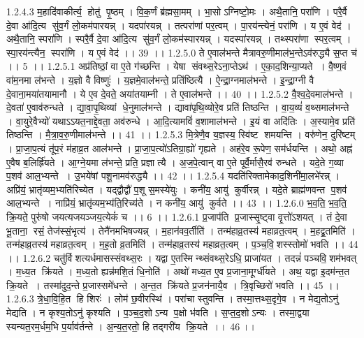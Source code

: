 1.2.4.3
म॒हादि॑वाकीर्त्य॒॒ होतु॑ पृ॒ष्ठम् । वि॒क॒र्णं ब्र॑ह्मसा॒मम् । भा॒सोऽग्निष्टो॒मः । अथै॒तानि॒ परा॑णि । परै॒र्वै दे॒वा आ॑दि॒त्य सु॑व॒र्गं लो॒कम॑पारयन्न् । यदपा॑रयन्न् । तत्परा॑णां पर॒त्वम् । पा॒रय॑न्त्येनं॒ परा॑णि । य ए॒वं वेद॑ । अथै॒तानि॒ स्परा॑णि । स्परै॒र्वै दे॒वा आ॑दि॒त्य सु॑व॒र्गं लो॒कम॑स्पारयन्न् । यदस्पा॑रयन्न् । तथ्स्परा॑णा स्पर॒त्वम् । स्पा॒रय॑न्त्यैन॒॒ स्परा॑णि । य ए॒वं वेद॑ ।। 39 ।।
1.2.5.0
ते ए॒वाल॑भन्ते मैत्रावरु॒णीमाल॑भ॒न्तेऽव॑रुद्ध्यै स॒प्त च॑ ।। 5 ।।
1.2.5.1
अप्र॑तिष्ठां॒ वा ए॒ते ग॑च्छन्ति । येषा॑ संवथ्स॒रेऽना॒प्तेऽथ॑ । ए॒का॒द॒शिन्या॒प्यते । वै॒ष्ण॒वं वा॑म॒नमा ल॑भन्ते । य॒ज्ञो वै विष्णुः॑ । य॒ज्ञमे॒वाल॑भन्ते॒ प्रति॑ष्ठित्यै । ऐ॒न्द्रा॒ग्नमाल॑भन्ते । इ॒न्द्रा॒ग्नी वै दे॒वाना॒मया॑तयामानौ । ये ए॒व दे॒वते॒ अया॑तयाम्नी । ते ए॒वाल॑भन्ते ।। 40 ।।
1.2.5.2
वै॒श्व॒दे॒वमाल॑भन्ते । दे॒वता॑ ए॒वाव॑रुन्धते । द्या॒वा॒पृ॒थिव्यां धे॒नुमाल॑भन्ते । द्यावा॑पृथि॒व्योरे॒व प्रति॑ तिष्ठन्ति । वा॒य॒व्यं॑ व॒थ्समाल॑भन्ते । वा॒युरे॒वैभ्यो॑ यथाऽऽयत॒नाद्दे॒वता॒ अव॑रुन्धे । आ॒दि॒त्यामविं॑ व॒शामाल॑भन्ते । इ॒यं वा अदि॑तिः । अ॒स्यामे॒व प्रति॑ तिष्ठन्ति । मै॒त्रा॒व॒रु॒णीमाल॑भन्ते ।। 41 ।।
1.2.5.3
मि॒त्रेणै॒व य॒ज्ञस्य॒ स्वि॑ष्ट शमयन्ति । वरु॑णेन॒ दुरि॑ष्टम् । प्रा॒जा॒प॒त्यं तू॑प॒रं म॑हाव्र॒त आल॑भन्ते । प्रा॒जा॒प॒त्यो॑ऽतिग्रा॒ह्यो॑ गृह्यते । अह॑रे॒व रू॒पेण॒ सम॑र्धयन्ति । अथो॒ अह्न॑ ए॒वैष ब॒लिर्ह्रि॑यते । आ॒ग्ने॒यमा ल॑भन्ते॒ प्रति॒ प्रज्ञात्यै । अ॒ज॒पे॒त्वान् वा ए॒ते पूर्वै॒र्मासै॒रव॑ रुन्धते । यदे॒ते ग॒व्या प॒शव॑ आल॒भ्यन्ते । उ॒भये॑षां पशू॒नामव॑रुद्ध्यै ।। 42 ।।
1.2.5.4
यदति॑रिक्तामेकाद॒शिनी॑मा॒लभे॑रन्न् । अप्रि॑यं॒ भ्रातृ॑व्यम॒भ्यति॑रिच्येत । यद्द्वौद्वौ॑ प॒शू स॒मस्ये॑युः । कनी॑य॒ आयु॑ कुर्वीरन्न् । यदे॒ते ब्राह्म॑णवन्त प॒शव॑ आल॒भ्यन्ते । नाप्रि॑यं॒ भ्रातृ॑व्यम॒भ्य॑ति॒रिच्य॑ते । न कनी॑य॒ आयु॑ कुर्वते ।। 43 ।।
1.2.6.0
भ॒व॒ति॒ भ॒व॒ति॒ क्रि॒यते॒ पुरु॑षो जयत्यजयञ्जय॒त्येकं॑ च ।। 6 ।।
1.2.6.1
प्र॒जाप॑ति प्र॒जास्सृ॒ष्ट्वा वृ॒त्तो॑ऽशयत् । तं दे॒वा भू॒ताना॒॒ रसं॒ तेज॑स्सं॒भृत्य॑ । तेनै॑नमभिषज्यन्न् । म॒हान॑वव॒र्तीति॑ । तन्म॑हाव्र॒तस्य॑ महाव्रत॒त्वम् । म॒हद्व्र॒तमिति॑ । तन्म॑हाव्र॒तस्य॑ महाव्रत॒त्वम् । म॒ह॒तो व्र॒तमिति॑ । तन्म॑हाव्र॒तस्य॑ महाव्रत॒त्वम् । प॒ञ्च॒वि॒॒शस्स्तोमो॑ भवति ।। 44 ।।
1.2.6.2
चतु॑र्विशत्यर्धमासस्संवथ्स॒रः । यद्वा ए॒तस्मिन्थ्संवथ्स॒रेऽधि॒ प्राजा॑यत । तदन्नं॑ पञ्चवि॒॒शम॑भवत् । म॒ध्य॒त क्रि॑यते । म॒ध्य॒तो ह्यन्न॑मशि॒तं धि॒नोति॑ । अथो॑ मध्य॒त ए॒व प्र॒जाना॒मूर्ग्धी॑यते । अथ॒ यद्वा इ॒दम॑न्त॒त क्रि॒यते । तस्मा॑दुद॒न्ते प्र॒जास्समे॑धन्ते । अ॒न्त॒त क्रि॑यते प्र॒जन॑नायै॒व । त्रि॒वृच्छिरो॑ भवति ।। 45 ।।
1.2.6.3
त्रे॒धा॒वि॒हि॒त हि शिरः॑ । लोम॑ छ॒वीरस्थि॑ । परा॑चा स्तुवन्ति । तस्मा॒त्तथ्स॒दृगे॒व । न मेद्य॒तोऽनु॑ मेद्यति । न कृश्य॒तोऽनु॑ कृश्यति । प॒ञ्च॒द॒शोऽन्य प॒क्षो भ॑वति । स॒प्त॒द॒शोऽन्यः । तस्मा॒द्वया॑ स्यन्यत॒रम॒र्धम॒भि प॒र्याव॑र्तन्ते । अ॒न्य॒त॒रतो॒ हि तद्गरी॑य क्रि॒यते ।। 46 ।।
